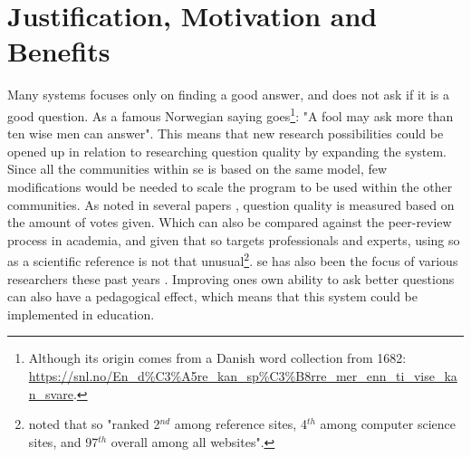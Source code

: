 \section{Justification, Motivation and Benefits}
\label{sec:justification}
Many systems focuses only on finding a good answer, and does not ask if it is a good question.
As a famous Norwegian saying goes\footnote{
	Although its origin comes from a Danish word collection from 1682: \\
	\url{https://snl.no/En\_d\%C3\%A5re\_kan\_sp\%C3\%B8rre\_mer\_enn\_ti\_vise\_kan\_svare}.
}: "A fool may ask more than ten wise men can answer".
This means that new research possibilities could be opened up in relation to researching question quality by expanding the system. 
Since all the communities within \gls{se} is based on the same model, few modifications would be needed to scale the program to be used within the other communities.
As noted in several papers \cite{Movshovitz-Attias2013, Nasehi2012, Posnett2012, M.Sewak2010, Treude2011, Yang2014}, question quality is measured based on the amount of votes given. 
Which can also be compared against the peer-review process in academia, and given that \gls{so} targets professionals and experts, 
using \gls{so} as a scientific reference is not that unusual\footnote{
	 \textcite[p.~1]{Posnett2012} noted that \gls{so} "ranked 2$^{nd}$ among reference sites, 4$^{th}$ among computer science sites, and 97$^{th}$ overall among all websites".
	 }.
\gls{se} has also been the focus of various researchers these past years \cite{Vasilescu2012}.
Improving ones own ability to ask better questions can also have a pedagogical effect, which means that this system could be implemented in education. 

